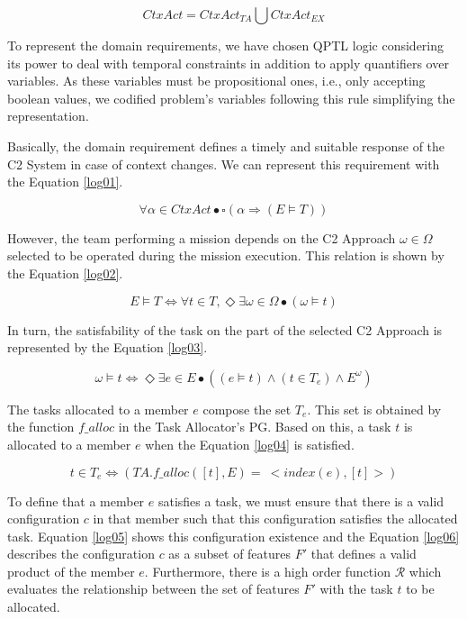\begin{equation}
    \label{ctx3}
    CtxAct = CtxAct_{TA} \bigcup CtxAct_{EX}
\end{equation}

To represent the domain requirements, we have chosen QPTL\cite{QPTL01} logic considering its power to deal with temporal constraints in addition to apply quantifiers over variables. As these variables must be propositional ones, i.e., only accepting boolean values, we codified problem's variables following this rule simplifying the representation.

Basically, the domain requirement defines a timely and suitable response of the C2 System in case of context changes. We can represent this requirement with the Equation \ref{log01}.

\begin{equation}
    \label{log01}
    \forall \alpha \in CtxAct \bullet \square ( \alpha \Rightarrow (E \models T))
\end{equation}

However, the team performing a mission depends on the C2 Approach $\omega \in \Omega$ selected to be operated during the mission execution. This relation is shown by the Equation \ref{log02}.

\begin{equation}
    \label{log02}
     E \models T \Longleftrightarrow \forall t \in T, \Diamond \exists \omega \in \Omega \bullet (\omega \models t) 
\end{equation}

In turn, the satisfability of the task on the part of the selected C2 Approach is represented by the Equation \ref{log03}.

\begin{equation}
    \label{log03}
     \omega \models t \Longleftrightarrow  \Diamond \exists e \in E \bullet  (( e \models t ) \land (t \in T_e) \land E^\omega) 
\end{equation}

The tasks allocated to a member $e$ compose the set $T_e$. This set is obtained by the function $f\_alloc$ in the Task Allocator's PG. Based on this, a task $t$ is allocated to a member $e$ when the Equation \ref{log04} is satisfied.

\begin{equation}
    \label{log04}
       t \in T_e \Longleftrightarrow (TA.f\_alloc([t],E) =\ <index(e),[t]>)
\end{equation}

To define that a member $e$ satisfies a task, we must ensure that there is a valid configuration $c$ in that member such that this configuration satisfies the allocated task. Equation \ref{log05} shows this configuration existence and the Equation \ref{log06} describes the configuration $c$ as a subset of features $F'$ that defines a valid product of the member $e$. Furthermore, there is a high order function $\mathcal{R}$ which evaluates the relationship between the set of features $F'$ with the task $t$ to be allocated.

